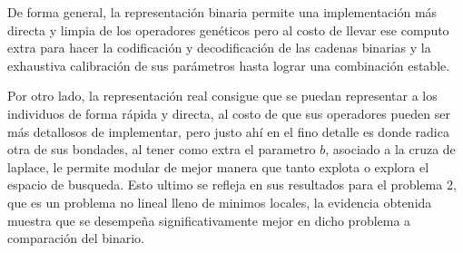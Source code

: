 \documentclass[runningheads]{llncs}
\begin{document}
De forma general, la representación binaria permite una implementación más directa y limpia de los operadores genéticos pero al costo de llevar ese computo extra para hacer la codificación y decodificación de las cadenas binarias y la exhaustiva calibración de sus parámetros hasta lograr una combinación estable. 

Por otro lado, la representación real consigue que se puedan representar a los individuos de forma rápida y directa, al costo de que sus operadores pueden ser más detallosos de implementar, pero justo ahí en el fino detalle es donde radica otra de sus bondades, al tener como extra el parametro $b$, asociado a la cruza de laplace, le permite modular de mejor manera que tanto explota o explora el espacio de busqueda. Esto ultimo se refleja en sus resultados para el problema 2, que es un problema no lineal lleno de minimos locales, la evidencia obtenida muestra que se desempeña significativamente mejor en dicho problema a comparación del binario.
\end{document}
